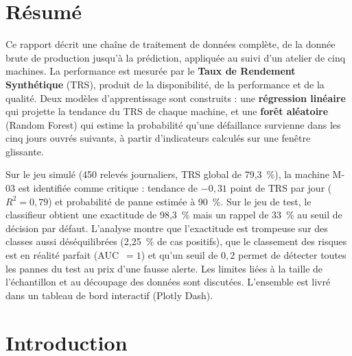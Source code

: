 \documentclass[11pt,a4paper]{article}
\newcommand{\pct}[1]{#1~\%}
\begin{document}
\section*{Résumé}
Ce rapport décrit une chaîne de traitement de données complète, de la donnée brute de production
jusqu'à la prédiction, appliquée au suivi d'un atelier de cinq machines. La performance est mesurée
par le \textbf{Taux de Rendement Synthétique} (TRS), produit de la disponibilité, de la performance
et de la qualité. Deux modèles d'apprentissage sont construits : une \textbf{régression linéaire}
qui projette la tendance du TRS de chaque machine, et une \textbf{forêt aléatoire} (Random Forest)
qui estime la probabilité qu'une défaillance survienne dans les cinq jours ouvrés suivants, à partir
d'indicateurs calculés sur une fenêtre glissante.

Sur le jeu simulé (450 relevés journaliers, TRS global de \pct{79,3}), la machine M-03 est
identifiée comme critique : tendance de $-0{,}31$ point de TRS par jour ($R^2 = 0{,}79$) et
probabilité de panne estimée à \pct{90}. Sur le jeu de test, le classifieur obtient une exactitude
de \pct{98,3} mais un rappel de \pct{33} au seuil de décision par défaut. L'analyse montre que
l'exactitude est trompeuse sur des classes aussi déséquilibrées (\pct{2,25} de cas positifs), que
le classement des risques est en réalité parfait (AUC~$=1$) et qu'un seuil de $0{,}2$ permet de
détecter toutes les pannes du test au prix d'une fausse alerte. Les limites liées à la taille de
l'échantillon et au découpage des données sont discutées. L'ensemble est livré dans un tableau de
bord interactif (Plotly Dash).

\vspace{0.4cm}

\newpage
\tableofcontents
\newpage

\section{Introduction}
\end{document}
